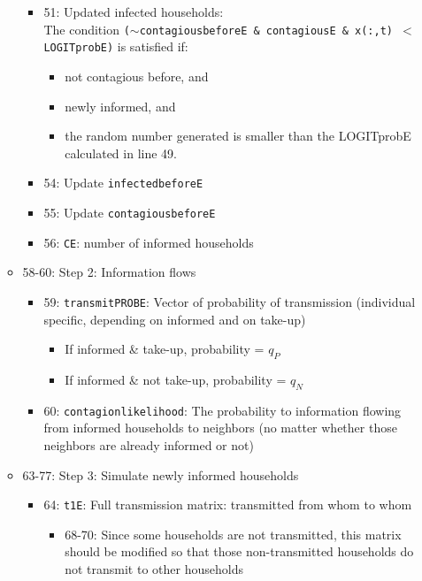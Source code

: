 \documentclass[10pt,letterpaper]{article}
\begin{document}
\begin{itemize}
\begin{itemize}
\begin{itemize}
          \item 51: Updated infected households: \\
            The condition \texttt{($\sim$contagiousbeforeE \& contagiousE \& x(:,t) $<$ LOGITprobE)} is satisfied if:
            \begin{itemize}
              \item not contagious before, and 
              \item newly informed, and
              \item the random number generated is smaller than the LOGITprobE calculated in line 49.
            \end{itemize}
          \item 54: Update \texttt{infectedbeforeE}
          \item 55: Update \texttt{contagiousbeforeE}
          \item 56: \texttt{CE}: number of informed households
        \end{itemize}
      \item 58-60: Step 2: Information flows
        \begin{itemize}
          \item 59: \texttt{transmitPROBE}: Vector of probability of transmission (individual specific, depending on informed and on take-up)
            \begin{itemize}
              \item If informed \& take-up, probability = $q_P$
              \item If informed \& not take-up, probability = $q_N$
            \end{itemize}
          \item 60: \texttt{contagionlikelihood}: The probability to information flowing from informed households to neighbors (no matter whether those neighbors are already informed or not)
        \end{itemize}
      \item 63-77: Step 3: Simulate newly informed households
        \begin{itemize}
          \item 64: \texttt{t1E}: Full transmission matrix: transmitted from whom to whom
            \begin{itemize}
              \item 68-70: Since some households are not transmitted, this matrix should be modified so that those non-transmitted households do not transmit to other households
            \end{itemize}

\end{itemize}
\end{itemize}
\end{itemize}
\end{document}
